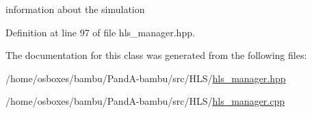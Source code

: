 information about the simulation 



Definition at line 97 of file hls\+\_\+manager.\+hpp.



The documentation for this class was generated from the following files\+:\begin{DoxyCompactItemize}
\item 
/home/osboxes/bambu/\+Pand\+A-\/bambu/src/\+H\+L\+S/\hyperlink{hls__manager_8hpp}{hls\+\_\+manager.\+hpp}\item 
/home/osboxes/bambu/\+Pand\+A-\/bambu/src/\+H\+L\+S/\hyperlink{hls__manager_8cpp}{hls\+\_\+manager.\+cpp}\end{DoxyCompactItemize}
